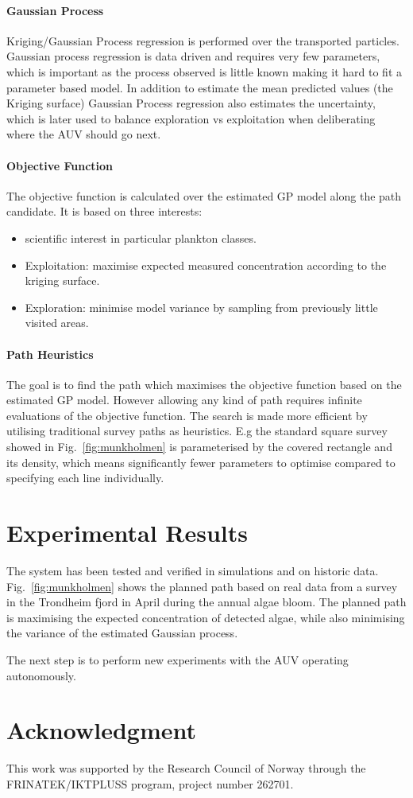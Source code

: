 \documentclass[conference]{IEEEtran}
\begin{document}
\paragraph{Gaussian Process}
Kriging/Gaussian Process regression is performed over the transported particles.
Gaussian process regression is data driven and requires very few parameters, which is important as the process observed is little known making it hard to fit a parameter based model.
In addition to estimate the mean predicted values (the Kriging surface) Gaussian Process regression also estimates the uncertainty, which is later used to balance exploration vs exploitation when deliberating where the AUV should go next.
\paragraph{Objective Function}
The objective function is calculated over the estimated GP model along the path candidate.
It is based on three interests:
\begin{itemize}
    \item scientific interest in particular plankton classes.
    \item Exploitation: maximise expected measured concentration according to the kriging surface.
    \item Exploration: minimise model variance by sampling from previously little visited areas.
\end{itemize}



\paragraph{Path Heuristics}
The goal is to find the path which maximises the objective function based on the estimated GP model.
However allowing any kind of path requires infinite evaluations of the objective function.
The search is made more efficient by utilising traditional survey paths as heuristics. E.g the standard square survey showed in Fig.~\ref{fig:munkholmen} is parameterised by the covered rectangle and its density, which means significantly fewer parameters to optimise compared to specifying each line individually. 

\section{Experimental Results}
The system has been tested and verified in simulations and on historic data. Fig.~\ref{fig:munkholmen} shows the planned path based on real data from a survey in the Trondheim fjord in April during the annual algae bloom. The planned path is maximising the expected concentration of detected algae, while also minimising the variance of the estimated Gaussian process. 

The next step is to perform new experiments with the AUV operating autonomously.
\section*{Acknowledgment}
This work was supported by the Research Council of Norway through the FRINATEK/IKTPLUSS program, project number 262701.
\end{document}
